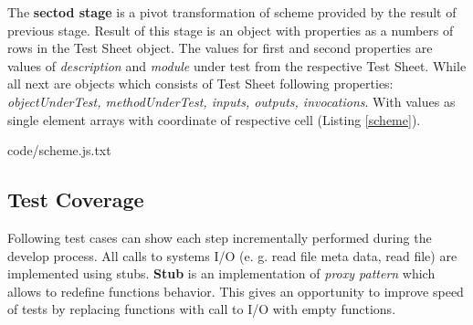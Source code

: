 The \textbf{sectod stage} is a pivot transformation of scheme provided by the result of previous stage. Result of this stage is an object with properties  as a numbers of rows in the Test Sheet object. The values for first and second properties are values of \textit{description} and \textit{module} under test from the respective Test Sheet. While all next are objects which consists of Test Sheet following properties: \textit{objectUnderTest, methodUnderTest, inputs, outputs, invocations}. With values as single element arrays with coordinate of respective cell (Listing \ref{scheme}).

{code/scheme.js.txt}

%
\subsection{Test Coverage}
Following test cases can show each step incrementally performed during the develop process. All calls to systems I/O (e. g. read file meta data, read file) are implemented using stubs. \textbf{Stub} is an implementation of \textit{proxy pattern} which allows to redefine functions behavior. This gives an opportunity to improve speed of tests by replacing functions with call to I/O with empty functions.
%

